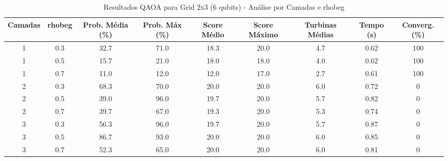 \begin{table*}[htbp]
\centering
\caption{Resultados QAOA para Grid 2x3 (6 qubits) - Análise por Camadas e rhobeg}
\label{tab:resultados_2_3}
\footnotesize
\begin{tabular}{|c|c|c|c|c|c|c|c|c|}
\hline
\textbf{Camadas} & \textbf{rhobeg} & \textbf{Prob. Média (\%)} & \textbf{Prob. Máx (\%)} & \textbf{Score Médio} & \textbf{Score Máximo} & \textbf{Turbinas Médias} & \textbf{Tempo (s)} & \textbf{Converg. (\%)} \\
\hline
1 & 0.3 & 32.7 & 71.0 & 18.3 & 20.0 & 4.7 & 0.62 & 100 \\
1 & 0.5 & 15.7 & 21.0 & 18.0 & 18.0 & 4.0 & 0.62 & 100 \\
1 & 0.7 & 11.0 & 12.0 & 12.0 & 17.0 & 2.7 & 0.61 & 100 \\
2 & 0.3 & 68.3 & 70.0 & 20.0 & 20.0 & 6.0 & 0.72 & 0 \\
2 & 0.5 & 39.0 & 96.0 & 19.7 & 20.0 & 5.7 & 0.82 & 0 \\
2 & 0.7 & 39.7 & 67.0 & 19.3 & 20.0 & 5.3 & 0.74 & 0 \\
3 & 0.3 & 56.3 & 96.0 & 19.7 & 20.0 & 5.7 & 0.87 & 0 \\
3 & 0.5 & 86.7 & 93.0 & 20.0 & 20.0 & 6.0 & 0.85 & 0 \\
3 & 0.7 & 52.3 & 65.0 & 20.0 & 20.0 & 6.0 & 0.81 & 0 \\
\hline
\end{tabular}
\end{table*}